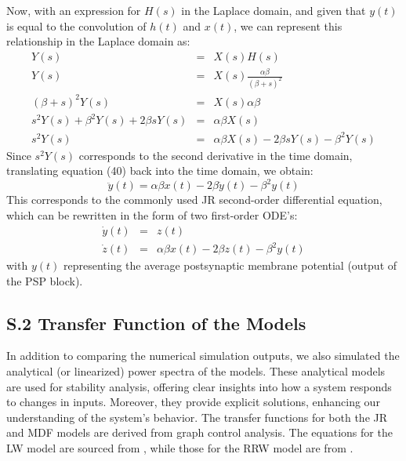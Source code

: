 \documentclass[12pt,twoside]{article}
\begin{document}
Now, with an expression for $H(s)$ in the Laplace domain, and given that $y(t)$ is equal to the convolution of $h(t)$ and $x(t)$, we can represent this relationship in the Laplace domain as:
\begin{eqnarray}
    Y(s) &=& X(s)H(s)\\
    Y(s) &=& X(s)\frac{\alpha \beta}{(\beta + s)^{2}}\\
    (\beta +s)^{2}Y(s) &=& X(s)\alpha \beta\\
    s^{2}Y(s) + \beta^{2}Y(s) + 2\beta s Y(s) &=& \alpha \beta X(s)\\
    s^{2}Y(s) &=& \alpha \beta X(s) - 2\beta s Y(s) - \beta^{2}Y(s)
\end{eqnarray}
Since $s^{2}Y(s)$ corresponds to the second derivative in the time domain, translating equation (40) back into the time domain, we obtain:
\begin{equation}
    \ddot{y}(t) = \alpha \beta x(t) - 2\beta \dot{y}(t) - \beta^{2}y(t)
\end{equation}
This corresponds to the commonly used JR second-order differential equation, which can be rewritten in the form of two first-order ODE's:
\begin{eqnarray}
    \dot{y}(t) &=& z(t)\\
    \dot{z}(t) &=& \alpha \beta x(t) -2\beta z(t) - \beta^{2}y(t)
\end{eqnarray}
with $y(t)$ representing the average postsynaptic membrane potential (output of the PSP block). 


\newpage
\subsection*{S.2 Transfer Function of the Models}
In addition to comparing the numerical simulation outputs, we also simulated the analytical (or linearized) power spectra of the models. These analytical models are used for stability analysis, offering clear insights into how a system responds to changes in inputs. Moreover, they provide explicit solutions, enhancing our understanding of the system's behavior. The transfer functions for both the JR and MDF models are derived from graph control analysis. The equations for the LW model are sourced from \citet{hartoyo2019parameter}, while those for the RRW model are from \citet{robinson2002dynamics}.
\end{document}
